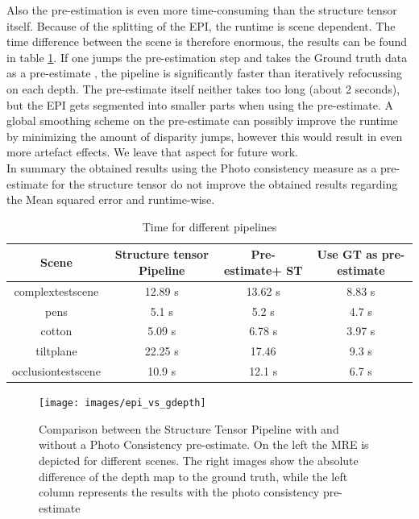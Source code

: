 \documentclass  [
  paper    = a4,
  BCOR     = 10mm,
  twoside,
  fontsize = 12pt,
  fleqn,
  toc      = bibnumbered,
  toc      = listofnumbered,
  numbers  = noendperiod,
  headings = normal,
  listof   = leveldown,
  version  = 3.03
]                                       {scrreprt}
\begin{document}
 	Also the pre-estimation is even more time-consuming than the structure tensor itself. Because of the splitting of the EPI, the runtime is scene dependent. The time difference between the scene is therefore enormous, the results can be found in table \ref{tab:time_gdepth}. If one jumps the pre-estimation step and takes the Ground truth data as a \glqq pre-estimate \grqq, the pipeline is significantly faster than iteratively refocussing on each depth. The pre-estimate itself neither takes too long (about 2 seconds), but the EPI gets segmented into smaller parts when using the pre-estimate. A global smoothing scheme on the pre-estimate can possibly improve the runtime by minimizing the amount of disparity jumps, however this would result in even more artefact effects. We leave that aspect for future work.\\ In summary the obtained results using the Photo consistency measure as a pre-estimate for the structure tensor do not improve the obtained results regarding the Mean squared error and runtime-wise. 
 	\begin{table}
	\begin{tabular}{|c|c|c|c|}
		\hline 
		Scene & Structure tensor Pipeline & Pre-estimate+ ST & Use GT as pre-estimate \\ 
		\hline 
		complextestscene & 12.89 s & 13.62 s & 8.83 s \\ 
		\hline 
		pens & 5.1 s & 5.2 s & 4.7 s \\ 
		\hline 
		cotton & 5.09 s & 6.78 s & 3.97 s \\ 
		\hline 
		tiltplane & 22.25 s & 17.46 &  9.3 s \\ 
		\hline 
		occlusiontestscene & 10.9 s & 12.1 s & 6.7 s \\ 
		\hline 
		
	\end{tabular} 
\label{tab:time_gdepth}
\caption[Time]{Time for different pipelines}
 	\end{table}

 	
 	
 	
 	\begin{figure}
 		\centering
 		\texttt{[image: images/epi\_vs\_gdepth]}
 		\caption[Photo-consistency Pre-estimate for the structure tensor]{Comparison between the Structure Tensor Pipeline with and without a Photo Consistency pre-estimate. On the left the MRE is depicted for different scenes. The right images show the absolute difference of the depth map to the ground truth, while the left column represents the results with the photo consistency pre-estimate}
 		\label{fig:epivsgdepth}
 	\end{figure}
 	
\end{document}
